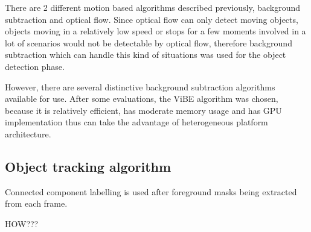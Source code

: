 There are 2 different motion based algorithms described previously, background subtraction and optical flow. Since optical flow can only detect moving objects, objects moving in a relatively low speed or stops for a few moments involved in a lot of scenarios would not be detectable by optical flow, therefore background subtraction which can handle this kind of situations was used for the object detection phase.

However, there are several distinctive background subtraction algorithms available for use. After some evaluations, the ViBE algorithm was chosen, because it is relatively efficient, has moderate memory usage and has GPU implementation thus can take the advantage of heterogeneous platform architecture.

\subsection{Object tracking algorithm}

Connected component labelling is used after foreground masks being extracted from each frame.

{\color{red}HOW???}
